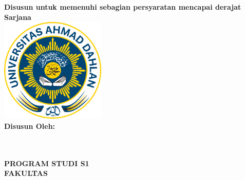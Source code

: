 

\begin{titlepage}
    \begin{center}
        \textbf{\Large{\judulid}}\\[2cm]
        \textbf{\large{\MakeUppercase{\tipe}}}\\[0.5cm]

        \textbf{\large{Disusun untuk memenuhi sebagian persyaratan mencapai derajat Sarjana}}\\[1.5cm]

        \includegraphics[width=5cm, height=5cm]{gambar/logo-uad.png}\\[1.5cm]

        \normalsize{\textbf{Disusun Oleh:}} \\[0.5cm]
        \normalsize{\MakeUppercase{{\penulis}}} \\
        \normalsize{{\nim}}\\

        \vfill

        \textbf{\large{\MakeUppercase{PROGRAM STUDI S1 \prodi}}}\\
        \textbf{\large{\MakeUppercase{FAKULTAS \fakultas}}}\\
        \textbf{\large{\MakeUppercase{\universitas}}}\\[1cm]
        \textbf{\large{\the\year{}}}\\
    \end{center}
\end{titlepage}

